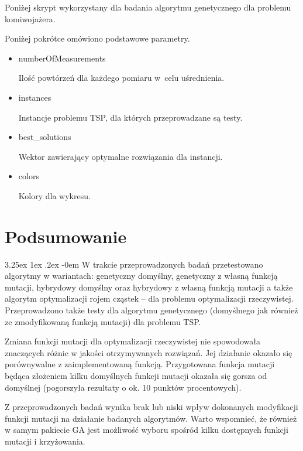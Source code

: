 \documentclass[11pt, a4paper]{article}
\makeatletter
\newcommand{\fbi}{\leavevmode{\parindent=1em\indent}}
\renewcommand\paragraph{\@startsection{paragraph}{5}{\z@}
  {3.25ex \@plus1ex \@minus.2ex}
  {-0em}
  {\normalfont\normalsize\bfseries}}
\makeatother
\begin{document}
\fbi
Poniżej skrypt wykorzystany dla badania algorytmu genetycznego dla problemu komiwojażera.



Poniżej pokrótce omówiono podstawowe parametry.

\begin{itemize}
	\item numberOfMeasurements
	
	Ilość powtórzeń dla każdego pomiaru w~celu uśrednienia.
	
	\item instances
	
	Instancje problemu TSP, dla których przeprowadzane są testy.
	
	\item best\_solutions
	
	Wektor zawierający optymalne rozwiązania dla instancji.
	
	\item colors
	
	Kolory dla wykresu.
	
\end{itemize}

\newpage
\section{Podsumowanie}
\paragraph{}
W trakcie przeprowadzonych badań przetestowano algorytmy w wariantach: genetyczny domyślny, genetyczny z własną funkcją mutacji, hybrydowy domyślny oraz hybrydowy z własną funkcją mutacji a także algorytm optymalizacji rojem cząstek -- dla problemu optymalizacji rzeczywistej. Przeprowadzono także testy dla algorytmu genetycznego (domyślnego jak również ze zmodyfikowaną funkcją mutacji) dla problemu TSP.

\fbi
Zmiana funkcji mutacji dla optymalizacji rzeczywistej nie spowodowała znaczących różnic w jakości otrzymywanych rozwiązań. Jej działanie okazało się porównywalne z zaimplementowaną funkcją. Przygotowana funkcja mutacji będąca złożeniem kilku domyślnych funkcji mutacji okazała się gorsza od domyślnej (pogorszyła rezultaty o ok. 10 punktów procentowych).

\fbi
Z przeprowadzonych badań wynika brak lub niski wpływ dokonanych modyfikacji funkcji mutacji na działanie badanych algorytmów. Warto wspomnieć, że również w samym pakiecie GA jest możliwość wyboru spośród kilku dostępnych funkcji mutacji i krzyżowania.
\end{document}
